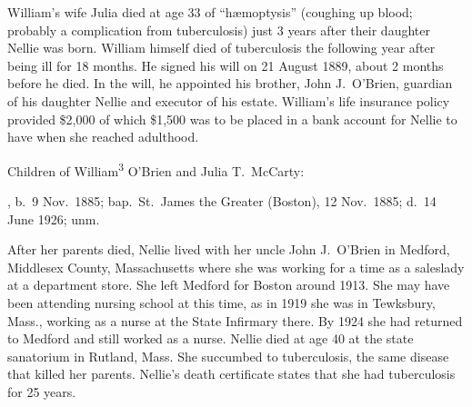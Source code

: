 William's wife Julia died at age 33 of ``h\ae moptysis'' (coughing up blood; probably a complication from tuberculosis) just 3 years after their daughter Nellie was born.\cite{JuliaMcCartyDeath} William himself died of tuberculosis the following year after being ill for 18 months.\cite{William3OBrienDeath} He signed his will on 21 August 1889, about 2 months before he died. In the will, he appointed his brother, John J.\ O'Brien, guardian of his daughter Nellie and executor of his estate. William's life insurance policy provided \$2,000 of which \$1,500 was to be placed in a bank account for Nellie to have when she reached adulthood.\cite{WilliamOBrienWill}

\begin{KidsIntro}
	Children of William\textsuperscript{3} O'Brien and Julia T.\ McCarty:
\end{KidsIntro}

\begin{Kids}
	, b.\ 9 Nov.\ 1885;\cite{Ellen4OBrienBirth} bap.\ St.\ James the Greater (Boston), 12 Nov.\ 1885;\cite{Ellen4OBrienBaptism} d.\ 14 June 1926;\cite{Ellen4OBrienDeath} unm.
	
	\begin{KidsMoreText}
		After her parents died, Nellie lived with her uncle John J.\ O'Brien in Medford, Middlesex County, Massachusetts\cite{Census1900EllenOBrien} where she was working for a time as a saleslady at a department store.\cite{Census1910EllenOBrien} She left Medford for Boston around 1913.\cite{Ellen4OBrien1914} She may have been attending nursing school at this time, as in 1919 she was in Tewksbury, Mass., working as a nurse at the State Infirmary there.\cite{Ellen4OBrien1919,Census1920EllenOBrien} By 1924 she had returned to Medford and still worked as a nurse.\cite{Ellen4OBrien1924} Nellie died at age 40 at the state sanatorium in Rutland, Mass.\cite{Ellen4OBrienDeath,RutlandHospital} She succumbed to tuberculosis,\cite{Ellen4OBrienDeath2} the same disease that killed her parents. Nellie's death certificate states that she had tuberculosis for 25 years.\cite{Ellen4OBrienDeath2}
	\end{KidsMoreText}

\end{Kids}